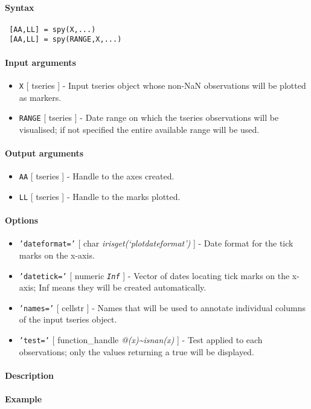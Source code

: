 


	\paragraph{Syntax}
 
 \begin{verbatim}
 [AA,LL] = spy(X,...)
 [AA,LL] = spy(RANGE,X,...)
 \end{verbatim}
 
 \paragraph{Input arguments}
 
 \begin{itemize}
 \item
   \texttt{X} {[} tseries {]} - Input tseries object whose non-NaN
   observations will be plotted as markers.
 \item
   \texttt{RANGE} {[} tseries {]} - Date range on which the tseries
   observations will be visualised; if not specified the entire available
   range will be used.
 \end{itemize}
 
 \paragraph{Output arguments}
 
 \begin{itemize}
 \item
   \texttt{AA} {[} tseries {]} - Handle to the axes created.
 \item
   \texttt{LL} {[} tseries {]} - Handle to the marks plotted.
 \end{itemize}
 
 \paragraph{Options}
 
 \begin{itemize}
 \item
   \texttt{'dateformat='} {[} char \textbar{}
   \emph{irisget(`plotdateformat')} {]} - Date format for the tick marks
   on the x-axis.
 \item
   \texttt{'datetick='} {[} numeric \textbar{} \emph{\texttt{Inf}} {]} -
   Vector of dates locating tick marks on the x-axis; Inf means they will
   be created automatically.
 \item
   \texttt{'names='} {[} cellstr {]} - Names that will be used to
   annotate individual columns of the input tseries object.
 \item
   \texttt{'test='} {[} function\_handle \textbar{}
   \emph{@(x)\textasciitilde{}isnan(x)} {]} - Test applied to each
   observations; only the values returning a true will be displayed.
 \end{itemize}
 
 \paragraph{Description}
 
 \paragraph{Example}


